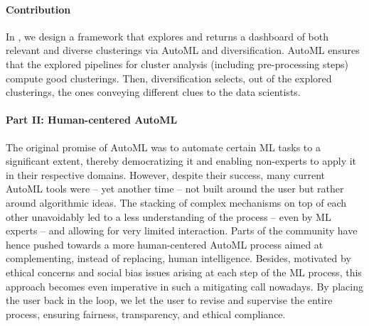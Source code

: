 \paragraph{Contribution} In , we design a framework that explores and returns a dashboard of both relevant and diverse clusterings via AutoML and diversification.
AutoML ensures that the explored pipelines for cluster analysis (including pre-processing steps) compute good clusterings.
Then, diversification selects, out of the explored clusterings, the ones conveying different clues to the data scientists.



\paragraph{Part II: Human-centered AutoML}

The original promise of AutoML was to automate certain ML tasks to a significant extent, thereby democratizing it and enabling non-experts to apply it in their respective domains.
However, despite their success, many current AutoML tools were -- yet another time -- not built around the user but rather around algorithmic ideas.
The stacking of complex mechanisms on top of each other unavoidably led to a less understanding of the process -- even by ML experts -- and allowing for very limited interaction.
Parts of the community have hence pushed towards a more human-centered AutoML process aimed at complementing, instead of replacing, human intelligence.
Besides, motivated by ethical concerns and social bias issues arising at each step of the ML process, this approach becomes even imperative in such a mitigating call nowadays.
By placing the user back in the loop, we let the user to revise and supervise the entire process, ensuring fairness, transparency, and ethical compliance.

